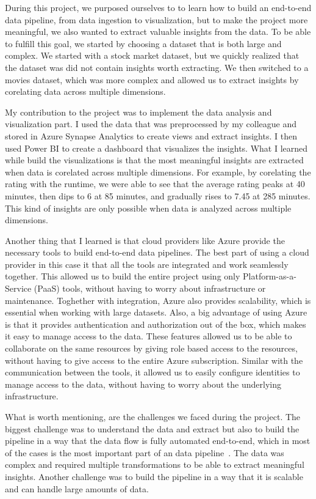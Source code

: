 \documentclass[a4paper,12pt]{article}
\begin{document}
During this project, we purposed ourselves to to learn how to build an end-to-end data pipeline, from data ingestion to visualization, but
to make the project more meaningful, we also wanted to extract valuable insights from the data. To be able to fulfill this goal, we started
by choosing a dataset that is both large and complex. We started with a stock market dataset, but we quickly realized that the dataset was
did not contain insights worth extracting. We then switched to a movies dataset, which was more complex and allowed us to extract insights
by corelating data across multiple dimensions.

My contribution to the project was to implement the data analysis and visualization part. I used the data that was preprocessed by my colleague
and stored in Azure Synapse Analytics to create views and extract insights. I then used Power BI to create a dashboard that visualizes the insights.
What I learned while build the visualizations is that the most meaningful insights are extracted when data is corelated across multiple dimensions.
For example, by corelating the rating with the runtime, we were able to see that the average rating peaks at 40 minutes, then dips to 6 at 85 minutes,
and gradually rises to 7.45 at 285 minutes. This kind of insights are only possible when data is analyzed across multiple dimensions.

Another thing that I learned is that cloud providers like Azure provide the necessary tools to build end-to-end data pipelines. The best
part of using a cloud provider in this case it that all the tools are integrated and work seamlessly together. This allowed us to build
the entire project using only Platform-as-a-Service (PaaS) tools, without having to worry about infrastructure or maintenance. Toghether with
integration, Azure also provides scalability, which is essential when working with large datasets. Also, a big advantage of using Azure is
that it provides authentication and authorization out of the box, which makes it easy to manage access to the data. These features allowed us
to be able to collaborate on the same resources by giving role based access to the resources, without having to give access to the entire
Azure subscription. Similar with the communication between the tools, it allowed us to easily configure identities to manage access to the
data, without having to worry about the underlying infrastructure.

What is worth mentioning, are the challenges we faced during the project. The biggest challenge was to understand the data and extract but also
to build the pipeline in a way that the data flow is fully automated end-to-end, which in most of the cases is the most important part of an
data pipeline~\cite{modelling-data-pipelines}. The data was complex and required multiple transformations
to be able to extract meaningful insights. Another challenge was to build the pipeline in a way that it is scalable and can handle large amounts
of data.
\end{document}
